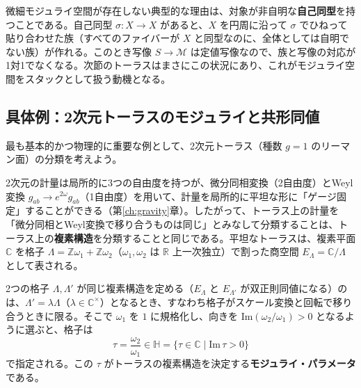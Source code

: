 \documentclass[uplatex, dvipdfmx, book]{jsbook}
\let\origsubsection\subsection
\let\origsubsubsection\subsubsection
\renewcommand{\section}{\origsubsection}
\renewcommand{\subsection}{\origsubsubsection}
\renewcommand{\subsubsection}{\paragraph}
\begin{document}
微細モジュライ空間が存在しない典型的な理由は、対象が非自明な\textbf{自己同型}を持つことである。自己同型 $\sigma: X \to X$ があると、$X$ を円周に沿って $\sigma$ でひねって貼り合わせた族（すべてのファイバーが $X$ と同型なのに、全体としては自明でない族）が作れる。このとき写像 $S \to \mathcal{M}$ は定値写像なので、族と写像の対応が1対1でなくなる。次節のトーラスはまさにこの状況にあり、これがモジュライ空間をスタックとして扱う動機となる。

\section{具体例：2次元トーラスのモジュライと共形同値}

最も基本的かつ物理的に重要な例として、2次元トーラス（種数 $g=1$ のリーマン面）の分類を考えよう。

2次元の計量は局所的に3つの自由度を持つが、微分同相変換（2自由度）とWeyl変換 $g_{ab} \to e^{2\omega} g_{ab}$（1自由度）を用いて、計量を局所的に平坦な形に「ゲージ固定」することができる（第\ref{ch:gravity}章）。したがって、トーラス上の計量を「微分同相とWeyl変換で移り合うものは同じ」とみなして分類することは、トーラス上の\textbf{複素構造}を分類することと同じである。平坦なトーラスは、複素平面 $\mathbb{C}$ を格子 $\Lambda = \mathbb{Z}\omega_1 + \mathbb{Z}\omega_2$（$\omega_1, \omega_2$ は $\mathbb{R}$ 上一次独立）で割った商空間 $E_\Lambda = \mathbb{C}/\Lambda$ として表される。

2つの格子 $\Lambda, \Lambda'$ が同じ複素構造を定める（$E_\Lambda$ と $E_{\Lambda'}$ が双正則同値になる）のは、$\Lambda' = \lambda\Lambda$（$\lambda \in \mathbb{C}^\times$）となるとき、すなわち格子がスケール変換と回転で移り合うときに限る。そこで $\omega_1$ を $1$ に規格化し、向きを $\mathrm{Im}(\omega_2/\omega_1) > 0$ となるように選ぶと、格子は
\begin{equation}
    \tau = \frac{\omega_2}{\omega_1} \in \mathbb{H} = \{ \tau \in \mathbb{C} \mid \mathrm{Im}\,\tau > 0 \}
\end{equation}
で指定される。この $\tau$ がトーラスの複素構造を決定する\textbf{モジュライ・パラメータ}である。
\end{document}
